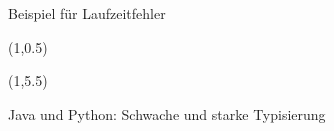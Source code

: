 \begin{frame}[fragile]{}
{\begin{textblock}{10}
\begin{figure}
                
                \caption{Beispiel für Laufzeitfehler}
            \end{figure}
        \end{textblock}    
    }
     {
        \begin{figure}
            \begin{textblock}{14}(1,0.5)
                
            \end{textblock}    
            \begin{textblock}{14}(1,5.5)
                
                \caption{Java und Python: Schwache und starke Typisierung}
            \end{textblock}    
        \end{figure}
    }
\end{frame}
